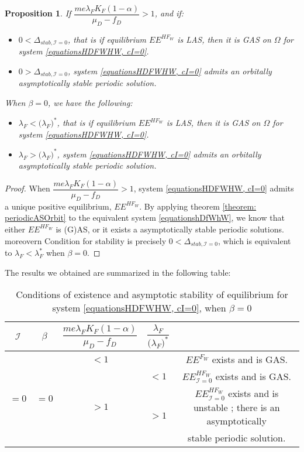 \documentclass{article}
\newcommand{\lfw}{\lambda_{F}}
\newcommand{\lfw}{\lambda_{F}}
\newcommand{\cI}{\mathcal{I}}
\newtheorem{prop}{Proposition}
\begin{document}
\begin{prop}\label{LimitCycle, cI=0}
If $\dfrac{m e \lfw K_F(1-\alpha)}{\mu_D - f_D} > 1$, and if:
\begin{itemize}
\item $0 < \Delta_{stab, \cI =0}$, that is if equilibrium $EE^{HF_W}$ is LAS, then it is GAS on $\Omega$ for system \eqref{equationsHDFWHW, cI=0}.
\item $0 > \Delta_{stab, \cI =0}$, system \eqref{equationsHDFWHW, cI=0} admits an orbitally asymptotically stable periodic solution.
\end{itemize}

When $\beta = 0$, we have the following:
\begin{itemize}
\item $\lfw < \Big( \lfw \Big)^*$, that is if equilibrium $EE^{HF_W}$ is LAS, then it is GAS on $\Omega$ for system \eqref{equationsHDFWHW, cI=0}.
\item $\lfw  > \Big(\lfw \Big)^*$, system \eqref{equationsHDFWHW, cI=0} admits an orbitally asymptotically stable periodic solution.
\end{itemize}
\end{prop}

\begin{proof}
When $\dfrac{m e \lfw K_F(1-\alpha)}{\mu_D - f_D} > 1$, system \eqref{equationsHDFWHW, cI=0} admits a unique positive equilibrium, $EE^{HF_W}$.  
By applying theorem \ref{theorem: periodicASOrbit} to the equivalent system \eqref{equationshDfWhW}, we know that either $EE^{HF_W}$ is (G)AS, or it exists a asymptotically stable periodic solutions. moreovern Condition for stability is precisely $0 < \Delta_{stab, \cI =0}$, which is equivalent to $\lfw < \lfw^*$ when $\beta = 0$.
\end{proof} 

The results we obtained are summarized in the following table:
\begin{table}[!ht]
\centering
\def\arraystretch{2}
\begin{tabular}{c|c|c|c|c}
$\cI$ &$\beta$ & $\dfrac{m e\lfw K_F(1-\alpha)}{\mu_D - f_D}$ &  $\dfrac{\lfw}{ \Big( \lfw \Big)^*}$ & \\
\hline
\multirow{4}{*}{$=0$}&\multirow{4}{*}{$=0$} & $ < 1$ & &$EE^{F_W}$ exists and is GAS.  \\
\cline{3-5}
 & & \multirow{3}{*}{$> 1$} & $ <1$ &$EE^{HF_W}_{\cI=0}$ exists and is GAS.\\
 \cline{4-5}
 & & &\multirow{2}{*}{$ > 1$} & $EE^{HF_W}_{\cI=0}$ exists and is unstable ; there is an asymptotically \\
& & & &  stable periodic solution.
\end{tabular}
\caption{\centering Conditions of existence and asymptotic stability of equilibrium for system \eqref{equationsHDFWHW, cI=0}, when $\beta = 0$}
\end{table}
\end{document}
